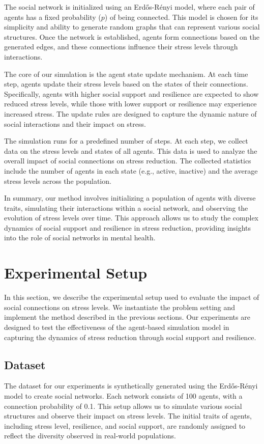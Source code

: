 \documentclass{article} %
\begin{document}
The social network is initialized using an Erdős-Rényi model, where each pair of agents has a fixed probability ($p$) of being connected. This model is chosen for its simplicity and ability to generate random graphs that can represent various social structures. Once the network is established, agents form connections based on the generated edges, and these connections influence their stress levels through interactions.

The core of our simulation is the agent state update mechanism. At each time step, agents update their stress levels based on the states of their connections. Specifically, agents with higher social support and resilience are expected to show reduced stress levels, while those with lower support or resilience may experience increased stress. The update rules are designed to capture the dynamic nature of social interactions and their impact on stress.

The simulation runs for a predefined number of steps. At each step, we collect data on the stress levels and states of all agents. This data is used to analyze the overall impact of social connections on stress reduction. The collected statistics include the number of agents in each state (e.g., active, inactive) and the average stress levels across the population.

In summary, our method involves initializing a population of agents with diverse traits, simulating their interactions within a social network, and observing the evolution of stress levels over time. This approach allows us to study the complex dynamics of social support and resilience in stress reduction, providing insights into the role of social networks in mental health.

\section{Experimental Setup}
\label{sec:experimental}

In this section, we describe the experimental setup used to evaluate the impact of social connections on stress levels. We instantiate the problem setting and implement the method described in the previous sections. Our experiments are designed to test the effectiveness of the agent-based simulation model in capturing the dynamics of stress reduction through social support and resilience.

\subsection{Dataset}
The dataset for our experiments is synthetically generated using the Erdős-Rényi model to create social networks. Each network consists of 100 agents, with a connection probability of 0.1. This setup allows us to simulate various social structures and observe their impact on stress levels. The initial traits of agents, including stress level, resilience, and social support, are randomly assigned to reflect the diversity observed in real-world populations.
\end{document}
